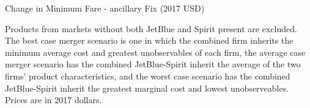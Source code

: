 \documentclass{article}
\begin{document}
    \begin{table}
        \caption{Change in Minimum Fare - ancillary Fix (2017 USD)}
        \label{tab:MinimumPrice_Aux_Scale}
                \vspace{-15mm}
        \begin{center}

        \end{center}
        \vspace{-5mm}
        \footnotesize{Products from markets without both JetBlue and Spirit present are excluded. The best case merger scenario is one in which the combined firm inherits the minimum average cost and greatest unobservables of each firm, the average case merger scenario has the combined JetBlue-Spirit inherit the average of the two firms' product characteristics, and the worst case scenario has the combined JetBlue-Spirit inherit the greatest marginal cost and lowest unobserveables. Prices are in 2017 dollars.}
    \end{table}    
\FloatBarrier
\pagebreak
\end{document}
